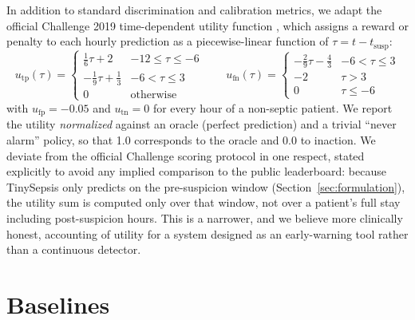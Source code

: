 \documentclass[11pt]{article}
\begin{document}
In addition to standard discrimination and calibration metrics, we adapt the official Challenge 2019 time-dependent utility function \citep{reyna2019early}, which assigns a reward or penalty to each hourly prediction as a piecewise-linear function of $\tau = t - t_{\text{susp}}$:
\[
u_{\text{tp}}(\tau) = \begin{cases}
\tfrac{1}{6}\tau + 2 & -12 \le \tau \le -6 \\
-\tfrac{1}{9}\tau + \tfrac{1}{3} & -6 < \tau \le 3 \\
0 & \text{otherwise}
\end{cases}
\qquad
u_{\text{fn}}(\tau) = \begin{cases}
-\tfrac{2}{9}\tau - \tfrac{4}{3} & -6 < \tau \le 3 \\
-2 & \tau > 3 \\
0 & \tau \le -6
\end{cases}
\]
with $u_{\text{fp}} = -0.05$ and $u_{\text{tn}} = 0$ for every hour of a non-septic patient. We report the utility \emph{normalized} against an oracle (perfect prediction) and a trivial ``never alarm'' policy, so that 1.0 corresponds to the oracle and 0.0 to inaction. We deviate from the official Challenge scoring protocol in one respect, stated explicitly to avoid any implied comparison to the public leaderboard: because TinySepsis only predicts on the pre-suspicion window (Section~\ref{sec:formulation}), the utility sum is computed only over that window, not over a patient's full stay including post-suspicion hours. This is a narrower, and we believe more clinically honest, accounting of utility for a system designed as an early-warning tool rather than a continuous detector.

\section{Baselines}
\label{sec:baselines}
\end{document}
